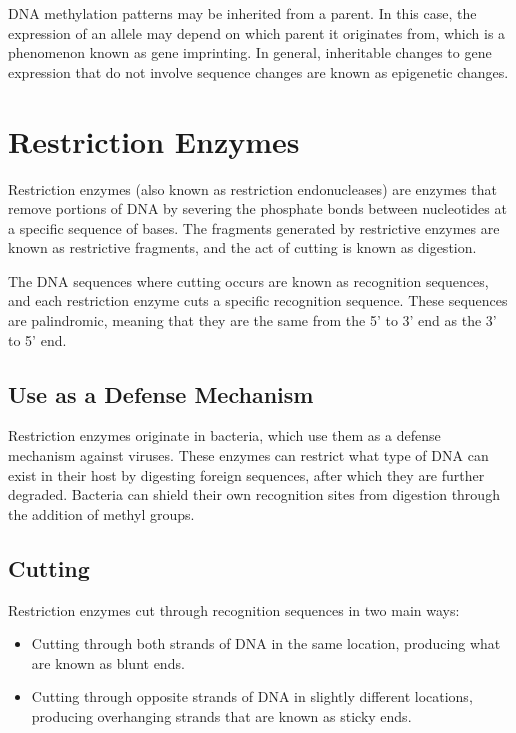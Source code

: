 \documentclass[12pt,titlepage]{article}
\begin{document}
        DNA methylation patterns may be inherited from a parent. In this case, the expression of an allele may depend on which parent it originates from,
        which is a phenomenon known as gene imprinting. In general, inheritable changes to gene expression that do not involve sequence changes are known
        as epigenetic changes.

  \newpage

  \section{Restriction Enzymes}
    Restriction enzymes (also known as restriction endonucleases) are enzymes that remove portions of DNA by severing the phosphate bonds between nucleotides
    at a specific sequence of bases. The fragments generated by restrictive enzymes are known as restrictive fragments, and the act of cutting is known as
    digestion.

    The DNA sequences where cutting occurs are known as recognition sequences, and each restriction enzyme cuts a specific recognition sequence. These
    sequences are palindromic, meaning that they are the same from the 5' to 3' end as the 3' to 5' end.

    \subsection{Use as a Defense Mechanism}
      Restriction enzymes originate in bacteria, which use them as a defense mechanism against viruses. These enzymes can restrict what type of DNA can exist in
      their host by digesting foreign sequences, after which they are further degraded. Bacteria can shield their own recognition sites from digestion through
      the addition of methyl groups.

    \subsection{Cutting}
      Restriction enzymes cut through recognition sequences in two main ways:
      \begin{itemize}
        \item Cutting through both strands of DNA in the same location, producing what are known as blunt ends.
        \item Cutting through opposite strands of DNA in slightly different locations, producing overhanging strands that are known as sticky ends.
      \end{itemize}
\end{document}
